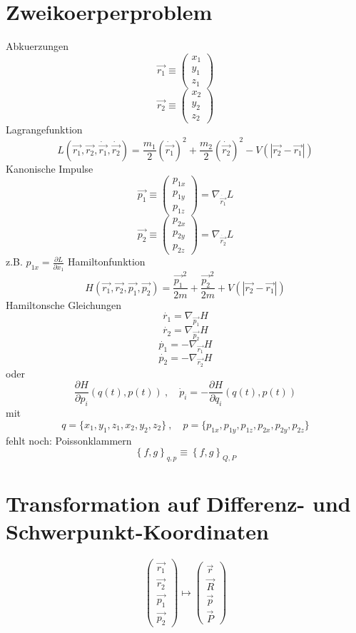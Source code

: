 \documentclass[10pt]{article} %
\begin{document}
\section{Zweikoerperproblem}

Abkuerzungen
\[\vec{r_1} \equiv \begin{pmatrix} x_1 \\ y_1 \\ z_1 \end{pmatrix}\]
\[\vec{r_2} \equiv \begin{pmatrix} x_2 \\ y_2 \\ z_2 \end{pmatrix}\]
Lagrangefunktion
\[
L(\vec{r_1},\vec{r_2},\dot{\vec{r_1}},\dot{\vec{r_2}}) = 
\frac{m_1}{2}(\dot{\vec{r_1}})^2 +  \frac{m_2}{2}(\dot{\vec{r_2}})^2
- V(\left| \vec{r_2} - \vec{r_1} \right|)
\]
Kanonische Impulse
\[ \vec{p_1} \equiv  \begin{pmatrix} p_{1x} \\ p_{1y} \\ p_{1z} \end{pmatrix} = \nabla _{\dot{\vec{r_1}}} L \]
\[ \vec{p_2} \equiv  \begin{pmatrix} p_{2x} \\ p_{2y} \\ p_{2z} \end{pmatrix} = \nabla _{\dot{\vec{r_2}}} L \]
 z.B. $ p_{1x} = \frac{\partial L}{\partial \dot{x_1}} $
Hamiltonfunktion
\[
H(\vec{r_1},\vec{r_2},\vec{p_1},\vec{p_2}) = 
\frac{\vec{p_1}^2}{2m} +  \frac{\vec{p_2}^2}{2m}
+ V(\left| \vec{r_2} - \vec{r_1} \right|)
\]
Hamiltonsche Gleichungen
\[ \dot{r_1} = \nabla_{\vec{p_1}} H \]
\[ \dot{r_2} = \nabla_{\vec{p_2}} H \]
\[ \dot{p_1} = - \nabla_{\vec{r_1}} H \]
\[ \dot{p_2} = - \nabla_{\vec{r_2}} H \]
oder
\[ \frac{\partial H}{\partial p_{i}}(q(t),p(t))\ ,\quad \dot{p}_{i}=-\frac{\partial H}{\partial q_{i}}(q(t),p(t)) \] 
mit
\[ q = \{ x_1, y_1, z_1, x_2, y_2, z_2 \} \ , \quad p = \{ p_{1x}, p_{1y}, p_{1z}, p_{2x}, p_{2y}, p_{2z} \} \]
fehlt noch: Poissonklammern
\[
\left\{f,g\right\}_{q,p}\equiv \left\{f,g\right\}_{Q,P}
\]

\section{Transformation auf Differenz- und Schwerpunkt-Koordinaten}
\[
\begin{pmatrix}
\vec{r_1} \\ \vec{r_2} \\ \vec{p_1} \\ \vec{p_2}
\end{pmatrix}
\mapsto
\begin{pmatrix}
\vec{r} \\ \vec{R} \\ \vec{p} \\ \vec{P}
\end{pmatrix}
\]
\end{document}
